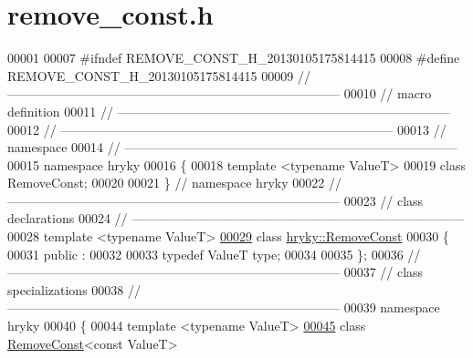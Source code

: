 \hypertarget{remove__const_8h_source}{\section{remove\-\_\-const.\-h}
}

\begin{DoxyCode}
00001 
00007 \textcolor{preprocessor}{#ifndef REMOVE\_CONST\_H\_20130105175814415}
00008 \textcolor{preprocessor}{}\textcolor{preprocessor}{#define REMOVE\_CONST\_H\_20130105175814415}
00009 \textcolor{preprocessor}{}\textcolor{comment}{//
      ------------------------------------------------------------------------------}
00010 \textcolor{comment}{// macro definition}
00011 \textcolor{comment}{//
      ------------------------------------------------------------------------------}
00012 \textcolor{comment}{//
      ------------------------------------------------------------------------------}
00013 \textcolor{comment}{// namespace}
00014 \textcolor{comment}{//
      ------------------------------------------------------------------------------}
00015 \textcolor{keyword}{namespace }hryky
00016 \{
00018     \textcolor{keyword}{template} <\textcolor{keyword}{typename} ValueT>
00019     \textcolor{keyword}{class }RemoveConst;
00020 
00021 \} \textcolor{comment}{// namespace hryky}
00022 \textcolor{comment}{//
      ------------------------------------------------------------------------------}
00023 \textcolor{comment}{// class declarations}
00024 \textcolor{comment}{//
      ------------------------------------------------------------------------------}
00028 \textcolor{comment}{}\textcolor{keyword}{template} <\textcolor{keyword}{typename} ValueT>
\hypertarget{remove__const_8h_source_l00029}{}\hyperlink{classhryky_1_1_remove_const}{00029} \textcolor{keyword}{class }\hyperlink{classhryky_1_1_remove_const}{hryky::RemoveConst}
00030 \{
00031 \textcolor{keyword}{public} :
00032 
00033     \textcolor{keyword}{typedef} ValueT type;
00034 
00035 \};
00036 \textcolor{comment}{//
      ------------------------------------------------------------------------------}
00037 \textcolor{comment}{// class specializations}
00038 \textcolor{comment}{//
      ------------------------------------------------------------------------------}
00039 \textcolor{keyword}{namespace }hryky
00040 \{
00044 \textcolor{keyword}{template} <\textcolor{keyword}{typename} ValueT>
\hypertarget{remove__const_8h_source_l00045}{}\hyperlink{classhryky_1_1_remove_const_3_01const_01_value_t_01_4}{00045} \textcolor{keyword}{class }\hyperlink{classhryky_1_1_remove_const}{RemoveConst}<const ValueT>

\end{DoxyCode}
